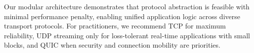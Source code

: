 \documentclass[12pt,a4paper]{article}
\begin{document}
Our modular architecture demonstrates that protocol abstraction is feasible with minimal performance penalty, enabling unified application logic across diverse transport protocols. For practitioners, we recommend TCP for maximum reliability, UDP streaming only for loss-tolerant real-time applications with small blocks, and QUIC when security and connection mobility are priorities.
\end{document}
